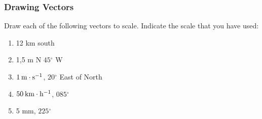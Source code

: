 {\begin{mdframed}[linewidth=4, leftmargin=40, rightmargin=40]
\begin{exercise}
\begin{enumerate}[noitemsep, label=\textbf{Step} \textbf{\arabic*}. ]
\begin{enumerate}[noitemsep, label=\textbf{\alph*}. ]
\begin{figure}[H]
\begin{center}
      \vspace{2pt}
    \vspace{.1in}
    
    \end{center}

 \end{figure}   

    \addtocounter{footnote}{-0}
    \end{enumerate}
        
      
      \end{enumerate}
         

    \end{exercise}
    \end{mdframed}
    }
    \noindent
  
\label{m38812*secfhsst!!!underscore!!!id228}
            \subsubsection{ Drawing Vectors }
            \nopagebreak
            \label{m38812*id188088}Draw each of the following vectors to scale. Indicate the scale that you have used:
      \label{m38812*id188094}\begin{enumerate}[noitemsep, label=\textbf{\arabic*}. ] 
            \label{m38812*uid30}\item 12 km south
\label{m38812*uid31}\item 1,5 m N \begin{math}45{}^{\circ }\end{math} W
\label{m38812*uid32}\item \begin{math}1\phantom{\rule{2pt}{0ex}}\mathrm{m}\ensuremath{\cdot}\mathrm{s}{}^{-1}\end{math}, \begin{math}20{}^{\circ }\end{math} East of North
\label{m38812*uid33}\item \begin{math}50\phantom{\rule{2pt}{0ex}}\mathrm{km}\ensuremath{\cdot}\mathrm{h}{}^{-1}\end{math}, \begin{math}085{}^{\circ }\end{math}\label{m38812*uid34}\item 5 mm, \begin{math}225{}^{\circ }\end{math}\end{enumerate}
                \par 
      

